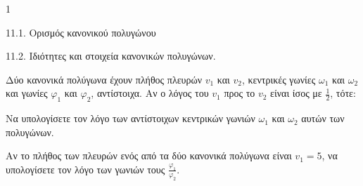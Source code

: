 \begin{ylh}{1}
    \item 11.1. Ορισμός κανονικού πολυγώνου
    \item 11.2. Ιδιότητες και στοιχεία κανονικών πολυγώνων.
\end{ylh}
Δύο κανονικά πολύγωνα έχουν πλήθος πλευρών $v_1$ και $v_2$, κεντρικές γωνίες $\omega_1$ και $\omega_2$ και γωνίες $\varphi_1$ και $\varphi_2$, αντίστοιχα. Αν ο λόγος του $v_1$ προς το $v_2$ είναι ίσος με $\frac{1}{2}$, τότε:
\begin{alist}
\item Να υπολογίσετε τον λόγο των αντίστοιχων κεντρικών γωνιών $\omega_1$ και $\omega_2$ αυτών των πολυγώνων. 
\item Αν το πλήθος των πλευρών ενός από τα δύο κανονικά πολύγωνα είναι $v_1 = 5$, να υπολογίσετε τον λόγο των γωνιών τους $\frac{\varphi_1}{\varphi_2}$. 
\end{alist}